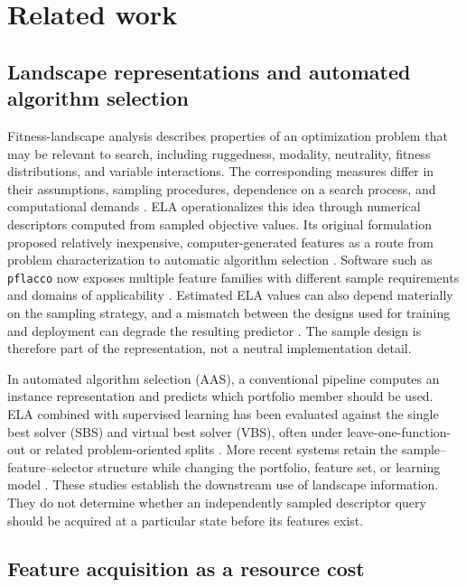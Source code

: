 \section{Related work}
\label{sec:related-work}

\subsection{Landscape representations and automated algorithm selection}

Fitness-landscape analysis describes properties of an optimization problem that
may be relevant to search, including ruggedness, modality, neutrality, fitness
distributions, and variable interactions.  The corresponding measures differ
in their assumptions, sampling procedures, dependence on a search process, and
computational demands \cite{malanSurveyTechniquesCharacterising2013}.  ELA
operationalizes this idea through numerical descriptors computed from sampled
objective values.  Its original formulation proposed relatively inexpensive,
computer-generated features as a route from problem characterization to
automatic algorithm selection \cite{mersmannExploratoryLandscapeAnalysis2011}.
Software such as \texttt{pflacco} now exposes multiple feature families with
different sample requirements and domains of applicability
\cite{pragerPflaccoFeaturebasedLandscape2024}.  Estimated ELA values can also
depend materially on the sampling strategy, and a mismatch between the designs
used for training and deployment can degrade the resulting predictor
\cite{renauExploratoryLandscapeAnalysis2020}.  The sample design is therefore
part of the representation, not a neutral implementation detail.

In automated algorithm selection (AAS), a conventional pipeline computes an
instance representation and predicts which portfolio member should be used.
ELA combined with supervised learning has been evaluated against the single
best solver (SBS) and virtual best solver (VBS), often under leave-one-function-
out or related problem-oriented splits
\cite{kerschkeAutomatedAlgorithmSelection2019}.  More recent systems retain the
sample--feature--selector structure while changing the portfolio, feature set,
or learning model \cite{guoAutomatedAlgorithmSelection2025}.  These studies
establish the downstream use of landscape information.  They do not determine
whether an independently sampled descriptor query should be acquired at a
particular state before its features exist.

\subsection{Feature acquisition as a resource cost}

